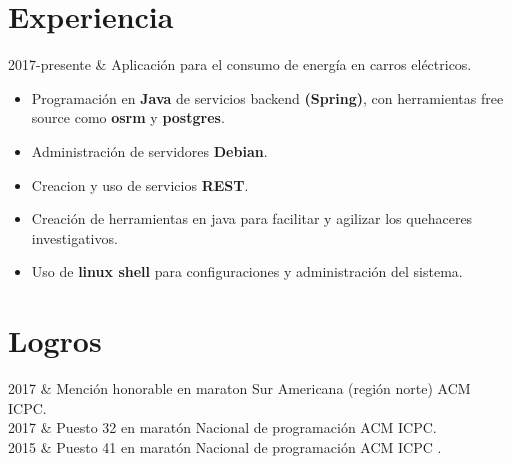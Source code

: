\documentclass[
    changecolor={111, 156, 45}, 
]{cv-roald}
\begin{document}
\section*{Experiencia}
\begin{tabularcv}
2017-presente   &   
                \newline Aplicación para el consumo de energía en carros eléctricos.
                \begin{itemize}
                  \item Programación en \textbf{Java} de servicios backend \textbf{(Spring)}, con herramientas free source como \textbf{osrm} y \textbf{postgres}.
                  \item Administración de servidores \textbf{Debian}.
                  \item Creacion y uso de servicios \textbf{REST}.
                  \item Creación de herramientas en java para facilitar y agilizar los quehaceres investigativos.
				  \item Uso de \textbf{linux shell} para configuraciones y administración del sistema. 
                \end{itemize} 

                
\end{tabularcv}   

\section*{Logros}
\begin{tabularcv}	
2017    &   Mención honorable en maraton Sur Americana (región norte) ACM ICPC. \\
2017	&	Puesto 32 en maratón Nacional de programación ACM ICPC.  \\
2015    &   Puesto 41 en maratón Nacional de programación ACM ICPC  .  \\

                
\end{tabularcv}
\end{document}
